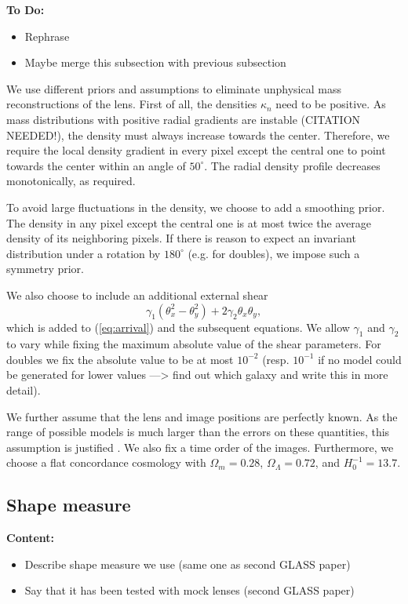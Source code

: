 \documentclass[useAMS,usenatbib]{mn2e}
\begin{document}
\textbf{To Do:}
\begin{itemize}
\item Rephrase
\item Maybe merge this subsection with previous subsection
\end{itemize}

We use different priors and assumptions to eliminate unphysical mass reconstructions of the lens. First of all, the densities $\kappa_{n}$ need to be positive. As mass distributions with positive radial gradients are instable (CITATION NEEDED!), the density must always increase towards the center. Therefore, we require the local density gradient in every pixel except the central one to point towards the center within an angle of $50^{\circ}$. The radial density profile decreases monotonically, as required.

To avoid large fluctuations in the density, we choose to add a smoothing prior. The density in any pixel except the central one is at most twice the average density of its neighboring pixels. If there is reason to expect an invariant distribution under a rotation by $180^{\circ}$ (e.g. for doubles), we impose such a symmetry prior.

We also choose to include an additional external shear
\begin{equation}
  \gamma_{1}\left(\theta_{x}^{2}-\theta_{y}^{2}\right)+2\gamma_{2}\theta_{x}\theta_{y},
\end{equation}
which is added to (\ref{eq:arrival}) and the subsequent equations. We allow $\gamma_{1}$ and $\gamma_{2}$ to vary while fixing the maximum absolute value of the shear parameters. For doubles we fix the absolute value to be at most $10^{-2}$ (resp. $10^{-1}$ if no model could be generated for lower values ---> find out which galaxy and write this in more detail).

We further assume that the lens and image positions are perfectly known. As the range of possible models is much larger than the errors on these quantities, this assumption is justified \citep{2006ApJ...650L..17S}. We also fix a time order of the images. Furthermore, we choose a flat concordance cosmology with $\Omega_{m}=0.28$, $\Omega_{\Lambda}=0.72$, and $H_{0}^{-1}=13.7$.

\subsection{Shape measure}
\textbf{Content:}
\begin{itemize}
\item Describe shape measure we use (same one as second GLASS paper)
\item Say that it has been tested with mock lenses (second GLASS paper)
\end{itemize}
\end{document}
